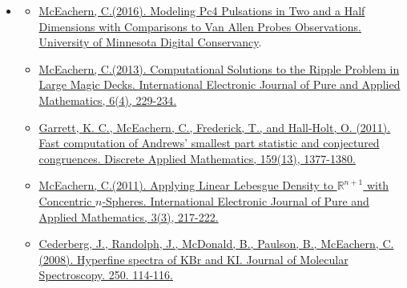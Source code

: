 \documentclass[12pt,letterpaper]{article}
\begin{document}
\begin{itemize}[leftmargin=\parindent]
    \parskip=0.1em
    \itemsep=1.2em

    \item[]
        \begin{itemize}[leftmargin=\parindent]
            \item \href{http://hdl.handle.net/11299/181780}{McEachern, C.\footnotemark[1] (2016). Modeling Pc4 Pulsations in Two and a Half Dimensions with Comparisons to Van Allen Probes Observations. University of Minnesota Digital Conservancy}.
            \item \href{http://e.ijpam.eu/contents/articles/201300604003.pdf}{McEachern, C.\footnotemark[1] (2013). Computational Solutions to the Ripple Problem in Large Magic Decks. International Electronic Journal of Pure and Applied Mathematics, 6(4), 229-234.}
            \item \href{https://doi.org/10.1016/j.dam.2011.04.022}{Garrett, K. C., McEachern, C.\footnotemark[1], Frederick, T., and Hall-Holt, O. (2011). Fast computation of Andrews’ smallest part statistic and conjectured congruences. Discrete Applied Mathematics, 159(13), 1377-1380.}
            \item \href{http://e.ijpam.eu/contents/articles/201100303004.pdf}{McEachern, C.\footnotemark[1] (2011). Applying Linear Lebesgue Density to $\mathbb{R}^{n+1}$ with Concentric $n$-Spheres. International Electronic Journal of Pure and Applied Mathematics, 3(3), 217-222.}
            \item \href{https://www.sciencedirect.com/science/article/abs/pii/S0022285208001872}{Cederberg, J., Randolph, J., McDonald, B., Paulson, B., McEachern, C.\footnotemark[1] (2008). Hyperfine spectra of KBr and KI. Journal of Molecular Spectroscopy. 250. 114-116.}
        \end{itemize}

\end{itemize}

\end{document}
